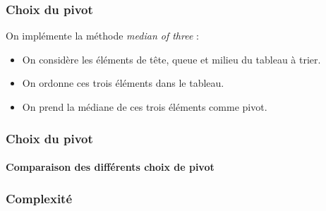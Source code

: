 \documentclass{beamer}
\begin{document}
			\begin{frame}
				\frametitle{Choix du pivot}

				On implémente la méthode \emph{median of three} : \pause 
				
				\begin{itemize}
					\item On considère les éléments de tête, queue et
						milieu du tableau à trier. \pause
					\item On ordonne ces trois éléments dans le tableau.
						\pause
					\item On prend la médiane de ces trois éléments comme
						pivot.
				\end{itemize}

			\end{frame}
			\begin{frame}
				\frametitle{Choix du pivot}
				\framesubtitle{Comparaison des différents choix de pivot}

				
			\end{frame}
			\begin{frame}
				\frametitle{Complexité}
				
				
			\end{frame}

\end{document}
